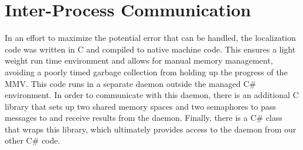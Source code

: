 \section{Inter-Process Communication}
In an effort to maximize the potential error that can be handled, the localization code was written in C and compiled to native machine code.  This ensures a light weight run time environment and allows for manual memory management, avoiding a poorly timed garbage collection from holding up the progress of the MMV.  This code runs in a separate daemon outside the managed C\# environment.  In order to communicate with this daemon, there is an additional C library that sets up two shared memory spaces and two semaphores to pass messages to and receive results from the daemon.  Finally, there is a C\# class that wraps this library, which ultimately provides access to the daemon from our other C\# code.
